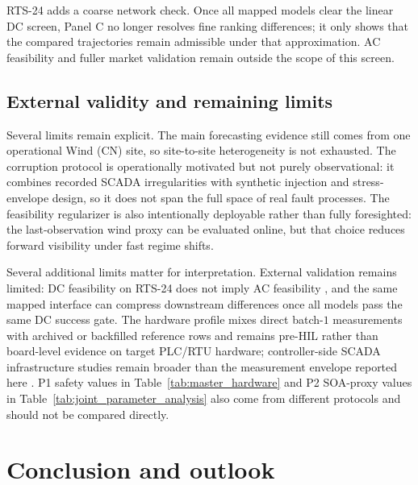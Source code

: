 ﻿\documentclass[review,1p,times]{elsarticle}
\begin{document}
RTS-24 adds a coarse network check. Once all mapped models clear the linear DC screen, Panel C no longer resolves fine ranking differences; it only shows that the compared trajectories remain admissible under that approximation. AC feasibility and fuller market validation remain outside the scope of this screen.

\subsection{External validity and remaining limits}
\label{subsec:disc_reliability}
\label{subsec:disc_crossover}

Several limits remain explicit. The main forecasting evidence still comes from one operational Wind (CN) site, so site-to-site heterogeneity is not exhausted. The corruption protocol is operationally motivated but not purely observational: it combines recorded SCADA irregularities with synthetic injection and stress-envelope design, so it does not span the full space of real fault processes. The feasibility regularizer is also intentionally deployable rather than fully foresighted: the last-observation wind proxy can be evaluated online, but that choice reduces forward visibility under fast regime shifts.

Several additional limits matter for interpretation. External validation remains limited: DC feasibility on RTS-24 does not imply AC feasibility \citep{larrahondo2021acdcomp}, and the same mapped interface can compress downstream differences once all models pass the same DC success gate. The hardware profile mixes direct batch-$1$ measurements with archived or backfilled reference rows and remains pre-HIL rather than board-level evidence on target PLC/RTU hardware; controller-side SCADA infrastructure studies remain broader than the measurement envelope reported here \citep{ren2020scada}. P1 safety values in Table~\ref{tab:master_hardware} and P2 SOA-proxy values in Table~\ref{tab:joint_parameter_analysis} also come from different protocols and should not be compared directly.
\section{Conclusion and outlook}
\label{sec:conclusion}
\end{document}
